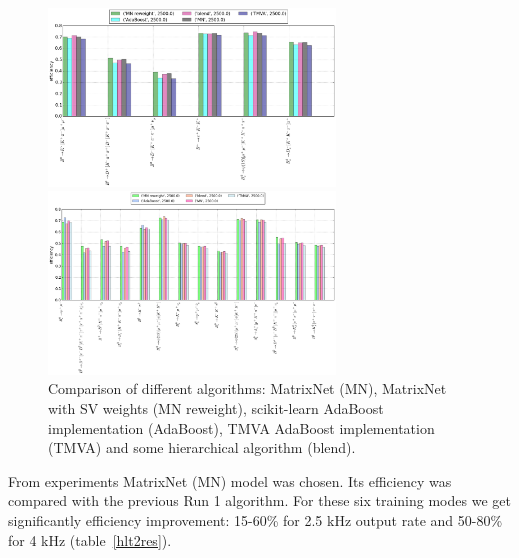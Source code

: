 \documentclass[a4paper]{jpconf}
\begin{document}
\begin{figure}[h]
\begin{minipage}{18pc}
\includegraphics[width=18pc]{../images/blend}
\end{minipage}\hspace{2pc}%
\begin{minipage}{18pc}
\includegraphics[width=18pc]{../images/hlt_mns}
\end{minipage} 
\caption{\label{hlt2_blend} Comparison of different algorithms: MatrixNet (MN), MatrixNet with SV weights (MN reweight), scikit-learn AdaBoost implementation (AdaBoost), TMVA AdaBoost implementation (TMVA) and some hierarchical algorithm (blend).}
\end{figure}

From experiments MatrixNet (MN) model was chosen. Its efficiency was compared with the previous Run 1 algorithm. For these six training modes we get significantly efficiency improvement: 15-60\% for 2.5 kHz output rate and 50-80\% for 4 kHz (table~\ref{hlt2res}).
\end{document}
